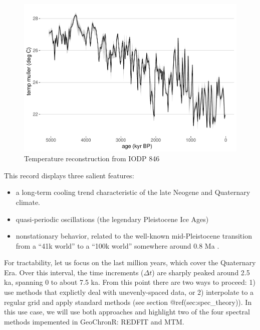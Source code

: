 \documentclass[gchron, manuscript]{copernicus}
\begin{document}
\begin{figure}
\includegraphics[width=12cm]{geoChronR-paper_files/figure-latex/odp846-timeseries-1} \caption{Temperature reconstruction from IODP 846}\label{fig:odp846-timeseries}
\end{figure}

This record displays three salient features:

\begin{itemize}
\item
  a long-term cooling trend characteristic of the late Neogene and Quaternary climate.
\item
  quasi-periodic oscillations (the legendary Pleistocene Ice Ages)
\item
  nonstationary behavior, related to the well-known mid-Pleistocene transition from a ``41k world'' to a ``100k world'' somewhere around 0.8 Ma \citep{Paillard_2001}.
\end{itemize}

For tractability, let us focus on the last million years, which cover the Quaternary Era.
Over this interval, the time increments (\(\Delta t\)) are sharply peaked around 2.5 ka, spanning 0 to about 7.5 ka.
From this point there are two ways to proceed: 1) use methods that explictly deal with unevenly-spaced data, or 2) interpolate to a regular grid and apply standard methods (see section @ref(sec:spec\_theory)).
In this use case, we will use both approaches and highlight two of the four spectral methods impemented in GeoChronR: REDFIT and MTM.
\end{document}
